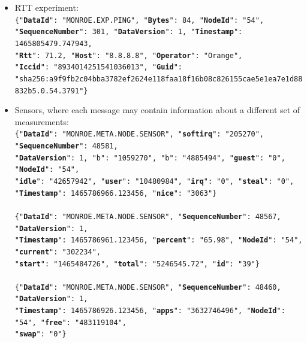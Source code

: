 \documentclass[a4paper,10pt]{article}
\begin{document}
\begin{itemize}
	\item RTT experiment:\\
	\texttt{\footnotesize\{"\textbf{DataId}": "MONROE.EXP.PING", "\textbf{Bytes}": 84, "\textbf{NodeId}": "54", \\
		"\textbf{SequenceNumber}": 301, "\textbf{DataVersion}": 1, "\textbf{Timestamp}": 1465805479.747943, \\
		"\textbf{Rtt}": 71.2, "\textbf{Host}": "8.8.8.8", "\textbf{Operator}": "Orange", \\
		"\textbf{Iccid}": "8934014251541036013", "\textbf{Guid}": \\ "sha256:a9f9fb2c04bba3782ef2624e118faa18f16b08c826155cae5e1ea7e1d88832b5.0.54.3791"\}}

	\item Sensors, where each message may contain information about a different set of measurements:\\
	\texttt{\footnotesize\{"\textbf{DataId}": "MONROE.META.NODE.SENSOR", "\textbf{softirq}": "205270", "\textbf{SequenceNumber}": 48581,\\
		"\textbf{DataVersion}": 1, "b": "1059270", "b": "4885494", "\textbf{guest}": "0", "\textbf{NodeId}": "54", \\
		"\textbf{idle}": "42657942", "\textbf{user}": "10480984", "\textbf{irq}": "0", "\textbf{steal}": "0", \\
		"\textbf{Timestamp}": 1465786966.123456, "\textbf{nice}": "3063"\}}\\~\\
	\texttt{\footnotesize\{"\textbf{DataId}": "MONROE.META.NODE.SENSOR", "\textbf{SequenceNumber}": 48567, "\textbf{DataVersion}": 1,\\
		"\textbf{Timestamp}": 1465786961.123456, "\textbf{percent}": "65.98", "\textbf{NodeId}": "54", "\textbf{current}": "302234", \\
		"\textbf{start}": "1465484726", "\textbf{total}": "5246545.72", "\textbf{id}": "39"\}}\\~\\
	\texttt{\footnotesize\{"\textbf{DataId}": "MONROE.META.NODE.SENSOR", "\textbf{SequenceNumber}": 48460, "\textbf{DataVersion}": 1,\\
		"\textbf{Timestamp}": 1465786926.123456, "\textbf{apps}": "3632746496", "\textbf{NodeId}": "54", "\textbf{free}": "483119104", \\
		"\textbf{swap}": "0"\}}
	

\end{itemize}
\end{document}
